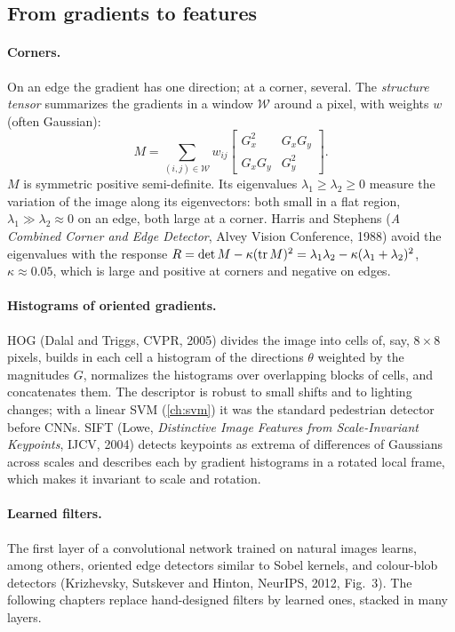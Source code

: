\begin{notechapter}
\section{From gradients to features}\label{convolution-filtering:sec:features}

\paragraph{Corners.} On an edge the gradient has one direction; at a corner, several. The
\emph{structure tensor} summarizes the gradients in a window $\mathcal W$ around a pixel, with weights
$w$ (often Gaussian):
\[
  M = \sum_{(i,j)\in\mathcal W}w_{ij}\begin{bmatrix}G_x^2 & G_xG_y\\ G_xG_y & G_y^2\end{bmatrix} .
\]
$M$ is symmetric positive semi-definite. Its eigenvalues $\lambda_1\geq\lambda_2\geq0$ measure the variation of the
image along its eigenvectors: both small in a flat region, $\lambda_1\gg\lambda_2\approx0$ on an edge, both large at
a corner. Harris and Stephens (\emph{A Combined Corner and Edge Detector}, Alvey Vision
Conference, 1988) avoid the eigenvalues with the response $R = \det M - \kappa(\operatorname{tr} M)^2 = \lambda_1\lambda_2 - \kappa(\lambda_1 + \lambda_2)^2$,
$\kappa\approx0.05$, which is large and positive at corners and negative on edges.

\paragraph{Histograms of oriented gradients.} HOG (Dalal and Triggs, CVPR, 2005) divides
the image into cells of, say, $8\times8$ pixels, builds in each cell a histogram of the directions $\theta$
weighted by the magnitudes $G$, normalizes the histograms over overlapping blocks of cells,
and concatenates them. The descriptor is robust to small shifts and to lighting changes;
with a linear SVM (\cref{ch:svm}) it was the standard pedestrian detector before CNNs.
SIFT (Lowe, \emph{Distinctive Image Features from Scale-Invariant Keypoints}, IJCV, 2004)
detects keypoints as extrema of differences of Gaussians across scales and describes each
by gradient histograms in a rotated local frame, which makes it invariant to scale and
rotation.

\paragraph{Learned filters.} The first layer of a convolutional network trained on natural
images learns, among others, oriented edge detectors similar to Sobel kernels, and
colour-blob detectors (Krizhevsky, Sutskever and Hinton, NeurIPS, 2012, Fig.~3). The
following chapters replace hand-designed filters by learned ones, stacked in many layers.


\end{notechapter}
